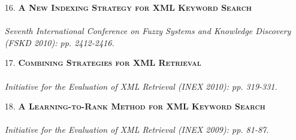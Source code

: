 \documentclass[a4paper, 11pt]{article}
\begin{document}
\begin{itemize}
\item[\color{bl3} 16.]{\scshape\color{bl3}\bf A New Indexing Strategy for XML Keyword Search}\\
\\
\emph{ Seventh International Conference on Fuzzy Systems and Knowledge Discovery (FSKD 2010): pp. 2412-2416.}
\vspace{2mm}

\item[\color{bl3} 17.]{\scshape\color{bl3}\bf Combining Strategies for XML Retrieval}\\
\\
\emph{ Initiative for the Evaluation of XML Retrieval (INEX 2010): pp. 319-331.}\\
\color{red}{\bf (INEX 2010 Best Student Paper Award)}
\vspace{2mm}


\item[\color{bl3} 18.]{\scshape\color{bl3}\bf A Learning-to-Rank Method for XML Keyword Search}\\
\\
\emph{ Initiative for the Evaluation of XML Retrieval (INEX 2009): pp. 81-87.}

 \end{itemize}        
\end{document}
